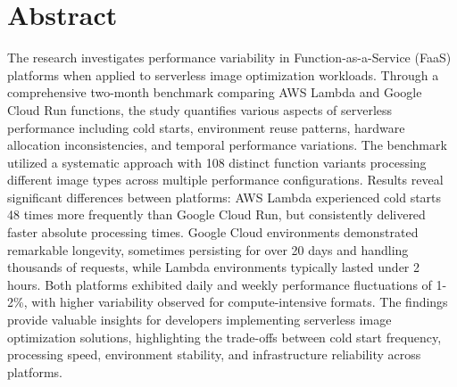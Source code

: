 \documentclass[a4paper, 11pt]{article}
\begin{document}


\newpage

\section*{Abstract}
The research investigates performance variability in Function-as-a-Service (FaaS) platforms when applied to serverless image optimization workloads. Through a comprehensive two-month benchmark comparing AWS Lambda and Google Cloud Run functions, the study quantifies various aspects of serverless performance including cold starts, environment reuse patterns, hardware allocation inconsistencies, and temporal performance variations. The benchmark utilized a systematic approach with 108 distinct function variants processing different image types across multiple performance configurations. Results reveal significant differences between platforms: AWS Lambda experienced cold starts 48 times more frequently than Google Cloud Run, but consistently delivered faster absolute processing times. Google Cloud environments demonstrated remarkable longevity, sometimes persisting for over 20 days and handling thousands of requests, while Lambda environments typically lasted under 2 hours. Both platforms exhibited daily and weekly performance fluctuations of 1-2\%, with higher variability observed for compute-intensive formats. The findings provide valuable insights for developers implementing serverless image optimization solutions, highlighting the trade-offs between cold start frequency, processing speed, environment stability, and infrastructure reliability across platforms.
\end{document}
